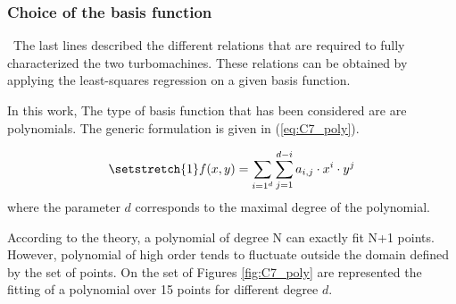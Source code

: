 \subsubsection{Choice of the basis function}
\quad\ The last lines described the different relations that are required to fully characterized the two turbomachines. These relations can be obtained by applying the least-squares regression on a given basis function. 

In this work, The type of basis function that has been considered are are polynomials. The generic formulation is given in (\ref{eq:C7_poly}).

\begin{equation}
    \setstretch{1}
    f(x,y) = \sum_{i=1^d}\sum_{j=1}^{d-i}a_{i,j}\cdot x^i\cdot y^j \label{eq:C7_poly}
\end{equation}
where the parameter $d$ corresponds to the maximal degree of the polynomial.

According to the theory, a polynomial of degree N can exactly fit N+1 points. However, polynomial of high order tends to fluctuate outside the domain defined by the set of points. On the set of Figures \ref{fig:C7_poly} are represented the fitting of a polynomial over 15 points for different degree $d$.


